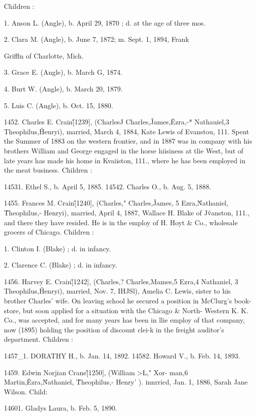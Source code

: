 Children : 

1. Anson L. (Angle), b. April 29, 1870 ; d. at the age of three mos. 

2. Clara M. (Angle), b. June 7, 1872; m. Sept. 1, 1894, Frank 

Griffln of Charlotte, Mich. 




3. Grace E. (Angle), b. March G, 1874. 

4. Burt W. (Angle), b. March 20, 1879. 

5. Luis C. (Angle), b. Oct. 15, 1880. 

1452. Charles E. Crain\^ [1239], (CharlesJ Charles,\^ James,\^ 
Ezra,-* Nathauiel,3 Theophilus,\^ Heuryi), married, March 4, 
1884, Kate Lewis of Evanstou, 111. Spent the Summer of 1883 
on the western frontier, and in 1887 was in company with his 
brothers William and George engaged in the horse hiisiness at tlie 
West, but of late years has made his home in Kvaiiston, 111., 
where he has been employed in the meat business. Children : 

14531. Ethel S., b. April 5, 1885. 
14542. Charles O., b. Aug. 5, 1888. 

1455. Frances M. Crain\^ [1240], (Charles," Charles,\^ 
James, 5 Ezra,\^ Nathaniel, \^ Theophilus,- Henryi), married, April 
4, 1887, Wallace H. Blake of J\^vanston, 111., and there they have 
resided. He is in the employ of H. Hoyt \& Co., wholesale 
grocers of Chicago. Children : 

1. Clinton I. (Blake) ; d. in infancy. 

2. Clarence C. (Blake) ; d. in infancy. 

1456. Harvey E. Crain\^ [1242], (Charles,? Charles,Mames,5 
Ezra,4 Nathaniel, 3 Theophilus,\^ Henryi), married, Nov. 7, IHJSl), 
Amelia C. Lewis, sister to his brother Charles' wife. On leaving 
school he secured a position in McClurg's book-store, but soon 
applied for a situation with the Chicago \& North- Western K. K. 
Co., was accepted, and for many years has been in llie employ of 
that company, now (1895) holding the position of discount clei-k 
in the freight auditor's department. Children : 

1457\_1. DORATHY H., b. Jan. 14, 1892. 
14582. Howard V., b. Feb. 14, 1893. 

1459. Edwin Norjian Crane\^ [1250], (William >L," Xor- 
man,6 Martin,\^ Ezra,\^ Nathaniel, \^ Theophilus,- Henry' ). innrricd, 
Jan. 1, 1886, Sarah Jane Wilson. Child: 

14601. Gladys Laura, b. Feb. 5, 1890. 

